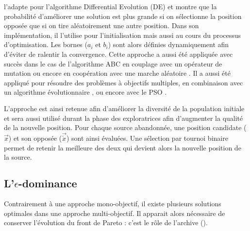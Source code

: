 \cite{Rahnamayan2008906} l’adapte pour l’algorithme Differential Evolution (DE)
et montre que la probabilité d’améliorer une solution est plus grande si on sélectionne
la position opposée que si on tire aléatoirement une autre position.
Dans son implémentation, il l’utilise pour l’initialisation mais aussi au cours du
processus d’optimisation. Les bornes ($a_{i}$ et $b_{i}$) sont alors définies dynamiquement
afin d’éviter de ralentir la convergence.
Cette approche a aussi été appliquée avec succès dans le cas de l’algorithme ABC
en couplage avec un opérateur de mutation \parencite{Bi2011174} ou encore en coopération
avec une marche aléatoire \parencite{Sharma2012213}. Il a aussi été appliqué pour
résoudre des problèmes à objectifs multiples, en combinaison avec un algorithme
évolutionnaire \parencite{Ma201448}, ou encore avec le PSO \parencite{Gao2013114}.

L’approche est ainsi retenue afin d’améliorer la diversité de la population initiale
et sera aussi utilisé durant la phase des exploratrices afin d’augmenter la qualité
de la nouvelle position.
Pour chaque source abandonnée, une position candidate ($\vec{x}$) et son opposée
($\vec{\check{x}}$) sont ainsi évaluées. Une sélection par tournoi binaire permet
de retenir la meilleure des deux qui devient alors la nouvelle position de la source.


\subsection[L’epsilon-dominance]{L’$\epsilon$-dominance} %
\label{sub:l_epsilon_dominance}
Contrairement à une approche mono-objectif, il existe plusieurs solutions optimales
dans une approche multi-objectif. Il apparait alors nécessaire de conserver l’évolution
du front de Pareto : c’est le rôle de l’archive ().


